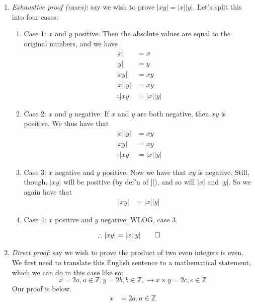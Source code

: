\documentclass[nobib]{tufte-handout}
\begin{document}
\begin{enumerate}
    \item \emph{Exhaustive proof (cases)}: say we wish to prove $|xy| = |x||y|$. 
    Let's split this into four cases:
    \begin{enumerate}
        \item Case 1: $x$ and $y$ positive.
        Then the absolute values are equal to the original
        numbers, and we have 
        \begin{align*}
            |x| &= x \\
            |y| &= y \\
            |xy| &= xy \\
            |x||y| &= xy \\
            \therefore |xy| &= |x||y|
        \end{align*}
        \item Case 2: $x$ and $y$ negative. 
        If $x$ and $y$ are both negative, then 
        $xy$ is positive. We thus have that 
        \begin{align*}
            |x||y| &= xy \\
            |xy| &= xy \\
            \therefore |xy| &= |x||y| 
        \end{align*}
        \item Case 3: $x$ negative and $y$ positive. 
        Now we have that $xy$ is negative. Still, though, 
        $|xy|$ will be positive (by def'n of ||), and so will 
        $|x|$ and $|y|$. So we again have that 
        \begin{align*}
            |xy| &= |x||y| 
        \end{align*}
        \item Case 4: $x$ positive and $y$ negative. 
        WLOG, case 3. 
    \end{enumerate}
    \begin{align*}
        \therefore |xy| &= |x||y| \qed
    \end{align*}
    \item \emph{Direct proof}: say we wish to prove the product of two even integers is even. 
    We first need to translate this English sentence to a mathematical 
    statement, which we can do in this case like so:
    \[x = 2a, a \in \mathbb{Z}, y = 2b, b \in \mathbb{Z}, \rightarrow x \times y = 2c, c \in \mathbb{Z}\]
    Our proof is below. 
    \begin{align*}
        x &= 2a, a \in \mathbb{Z} \\

\end{align*}
\end{enumerate}
\end{document}
